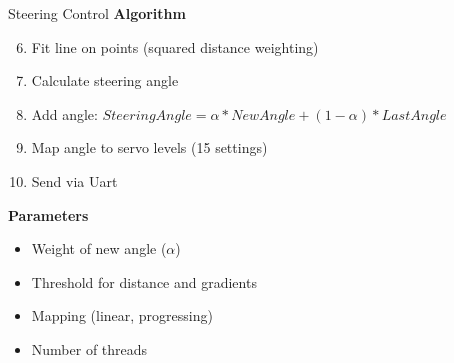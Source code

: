 \begin{frame}[plain]{Steering Control}
	\large
	\textbf{Algorithm}
	\begin{enumerate}
		\setcounter{enumi}{5}
		\item Fit line on points (squared distance weighting)
		\pause
		\item Calculate steering angle
		\pause
		\item Add angle: $SteeringAngle = \alpha * NewAngle + (1-\alpha) * LastAngle$
		\pause
		\item Map angle to servo levels (15 settings)
		\pause
		\item Send via Uart
	\end{enumerate}
	\pause
	\textbf{Parameters}
	\begin{itemize}
		\item Weight of new angle ($\alpha$)
		\item Threshold for distance and gradients
		\item Mapping (linear, progressing)
		\item Number of threads
	\end{itemize}
\end{frame}

